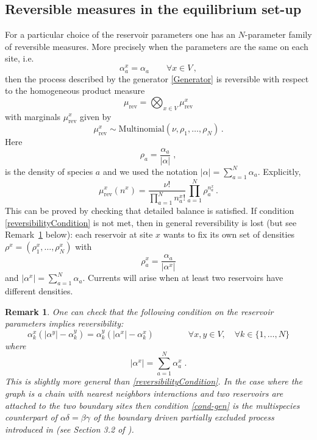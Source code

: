 \documentclass[10pt]{article}
\numberwithin{equation}{section}
\numberwithin{equation}{subsection}
\newtheorem{remark}{Remark}
\newcommand{\co}{\;,}
\newcommand{\dt}{\;.}
\newcommand{\twoj}{\nu}
\begin{document}
\subsection{Reversible measures in the equilibrium set-up}
For a particular choice of the reservoir parameters one has an $N$-parameter family of reversible measures. More precisely
when the parameters are the same on each site, i.e.
\begin{equation}\label{reversibilityCondition}
\alpha_{a}^{x}=\alpha_{a}\qquad \forall x\in V\,,
\end{equation}
then the process described by the generator \eqref{Generator} is reversible with respect to the 
homogeneous product measure 
\begin{equation}
\label{reversibleMeasure}
\mu_{\text{rev}}=\bigotimes_{x\in V}\mu_{\text{rev}}^{x}
\end{equation}
with marginals $\mu_{\text{rev}}^{x}$ given by 
\begin{equation}
 \mu^{x}_{\text{rev}}\sim \text{Multinomial}\left(\twoj,\rho_{1},\ldots,\rho_{N}\right)\,.
\end{equation}
Here
 $$
\rho_{a}=\frac{\alpha_{a}}{|\alpha|}\co
$$
is the density of species $a$ and we used the notation $|\alpha|=\sum_{a=1}^{N}\alpha_{a}$. Explicitly, 
\begin{equation}
\mu_{\text{rev}}^{x}(n^{x})=\frac{\nu!}{\prod_{a=1}^{N}n_{a}^{x}!}\prod_{a=1}^{N}\rho_{a}^{n_{a}^{x}}\,.
\end{equation}
This can be proved  by checking that detailed balance is satisfied. 
If condition \eqref{reversibilityCondition} is not met, then in general reversibility is lost (but see Remark~\ref{rem-rev} below): 
each reservoir at site $x$ wants to fix its own set of densities $\rho^{x}=(\rho_{1}^{x},\ldots,\rho_{N}^{x})$ with
\begin{equation}
\label{rhox}
\rho_{a}^x=\frac{\alpha_{a}}{|\alpha^x|}
\end{equation}
and  $|\alpha^x|=\sum_{a=1}^{N}\alpha_{a}$. 
Currents will arise when at least two reservoirs have different densities. 
\begin{remark}
\label{rem-rev}
		One can check that the following condition on the reservoir parameters implies reversibility:
		\begin{equation}
		\label{cond-gen}
			\alpha_{k}^{x}\left(|\alpha^{y}|-\alpha_{k}^{y}\right)=\alpha_{k}^{y}\left(|\alpha^{x}|-\alpha_{k}^{x}\right)\qquad\qquad \forall x,y\in V,\quad \forall k\in \{1,\ldots,N\}
		\end{equation}
		where
		\begin{equation}
			|\alpha^{x}|=\sum_{a=1}^{N}\alpha_{a}^{x}\dt
		\end{equation}
		This is slightly more general than \eqref{reversibilityCondition}. In the case where the graph is a chain with nearest neighbors interactions and two reservoirs are attached to the two boundary sites
		then condition \eqref{cond-gen} is the multispecies counterpart of $\alpha\delta=\beta\gamma$ of the boundary driven partially excluded process introduced in \cite{schutzSandow} (see Section 3.2 of \cite{carinci2013duality}).
		\end{remark}
\end{document}

